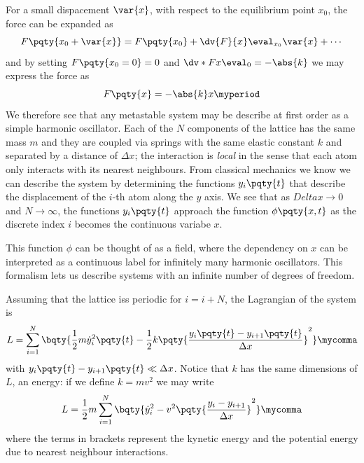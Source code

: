         For a small dispacement $\var{x}$, with respect to the equilibrium point $x_0$, the force can be expanded as
        \begin{equation*}
            F\pqty{x_0 + \var{x}} = F\pqty{x_0} + \dv{F}{x}\eval_{x_0}\var{x}  + \dotsb
        \end{equation*}
        and by setting $F\pqty{x_0 = 0} = 0$ and $\dv*{F}{x}\eval_{0} = -\abs{k}$ we may express the force as
        \begin{equation*}
            F\pqty{x} = -\abs{k} x
            \myperiod
        \end{equation*}
        We therefore see that any metastable system may be describe at first order as a simple harmonic oscillator. Each of the $N$ components of the lattice has the same mass $m$ and they are coupled via springs with the same elastic constant $k$ and separated by a distance of $\Delta x$; the interaction is \emph{local} in the sense that each atom only interacts with its nearest neighbours. From classical mechanics we know we can describe the system by determining the functions $y_i\pqty{t}$ that describe the displacement of the $i$-th atom along the $y$ axis. We see that as $Delta x\to 0$ and $N \to \infty$, the functions $y_i\pqty{t}$ approach the function $\phi\pqty{x,t}$ as the discrete index $i$ becomes the continuous variabe $x$.

        This function $\phi$ can be thought of as a field, where the dependency on $x$ can be interpreted as a continuous label for infinitely many harmonic oscillators. This formalism lets us describe systems with an infinite number of degrees of freedom.

        Assuming that the lattice iss periodic for $i = i + N$, the Lagrangian of the system is
        \begin{equation}
            L = \sum_{i=1}^{N} \bqty{\frac{1}{2} m \dot{y}_i^2\pqty{t} - \frac{1}{2} k \pqty{\frac{y_i\pqty{t} - y_{i+1}\pqty{t}}{\Delta x}}^2}
            \mycomma
        \end{equation}
        with $y_i\pqty{t} - y_{i+1}\pqty{t} \ll \Delta x$. Notice that $k$ has the same dimensions of $L$, an energy: if we define $k = mv^2$ we may write
        \begin{equation*}
            L = \frac{1}{2} m \sum_{i=1}^{N} \bqty{\dot{y}_i^2 - v^2 \pqty{\frac{y_i - y_{i+1}}{\Delta x}}^2}
            \mycomma
        \end{equation*}
        where the terms in brackets represent the kynetic energy and the potential energy due to nearest neighbour interactions.

